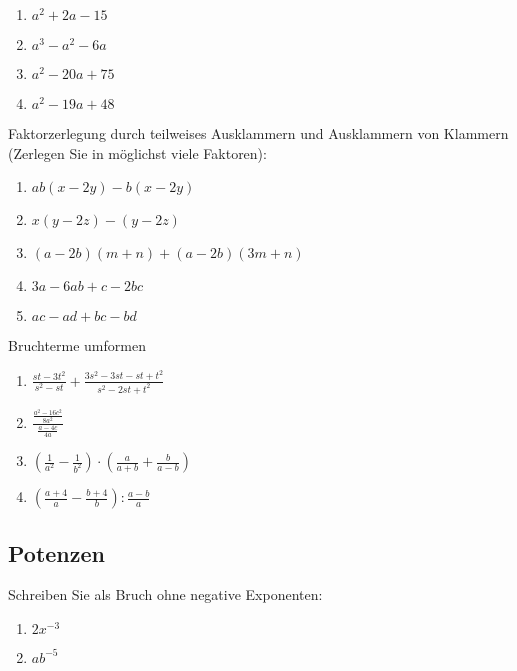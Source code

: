 \begin{multicols}{2}
\begin{enumerate}[label=\alph*)]
\item $a^2 + 2a -15$
\item $a^3-a^2-6a$
\item $a^2 - 20a + 75$
  \item $a^2 -19a + 48$
\end{enumerate}
\end{multicols}

Faktorzerlegung durch teilweises Ausklammern und Ausklammern von
Klammern (Zerlegen Sie in möglichst viele Faktoren):

\begin{multicols}{2}
\begin{enumerate}[label=\alph*)]
\item $ab(x-2y)-b(x-2y)$
\item $x(y-2z)-(y-2z)$
\item $(a-2b)(m+n)+(a-2b)(3m+n)$
\item $3a-6ab+c-2bc$
  \item $ac-ad+bc-bd$
\end{enumerate}
\end{multicols}

Bruchterme umformen

\begin{multicols}{2}
\begin{enumerate}[label=\alph*)]
\item $\frac{st-3t^2}{s^2-st} + \frac{3s^2-3st-st+t^2}{s^2-2st+t^2}$
\item $\frac{\frac{a^2-16c^2}{8a^2}}{\frac{a-4c}{4a}}$
\item $\left(\frac{1}{a^2} - \frac{1}{b^2}\right) \cdot
    \left(\frac{a}{a+b} + \frac{b}{a-b}\right)$
\item $\left( \frac{a+4}{a} - \frac{b+4}{b}\right) : \frac{a-b}{a}$
    
\end{enumerate}
\end{multicols}


\subsection{Potenzen}

Schreiben Sie als Bruch ohne negative Exponenten:

\begin{multicols}{2}
\begin{enumerate}[label=\alph*)]
\item $2x^{-3}$
  \item $ab^{-5}$
\end{enumerate}
\end{multicols}

